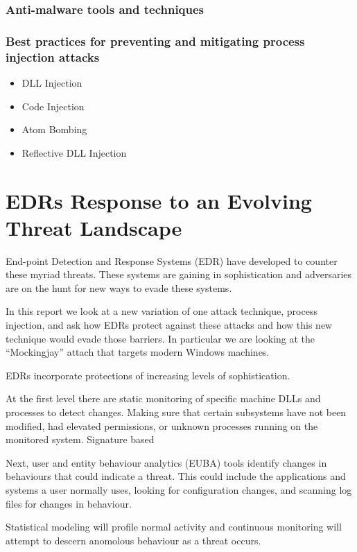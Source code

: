 \subsubsection{Anti-malware tools and techniques}

\subsubsection{Best practices for preventing and mitigating process injection attacks}

\begin{itemize}
\item DLL Injection
\item Code Injection
\item Atom Bombing
\item Reflective DLL Injection
\end{itemize}


\section{EDRs Response to an Evolving Threat Landscape}


End-point Detection and Response Systems (EDR) have developed to counter these myriad threats.  These systems are gaining in sophistication and adversaries
are on the hunt for new ways to evade these systems.

In this report we look at a new variation of one attack technique, process injection, and ask how EDRs protect against these attacks and how
this new technique would evade those barriers.  In particular we are looking at the ``Mockingjay'' attach that targets modern Windows machines.

EDRs incorporate protections of increasing levels of sophistication.

At the first level there are static monitoring of specific machine DLLs and processes to detect changes.  Making sure that certain subsystems
have not been modified, had elevated permissions, or unknown processes running on the monitored system.  Signature based

Next, user and entity behaviour analytics (EUBA) tools identify changes in behaviours that could indicate a threat.  This could include the
applications and systems a user normally uses, looking for configuration changes, and scanning log files for changes in behaviour.

Statistical modeling will profile normal activity and continuous monitoring will attempt to descern anomolous behaviour as a threat occurs.

